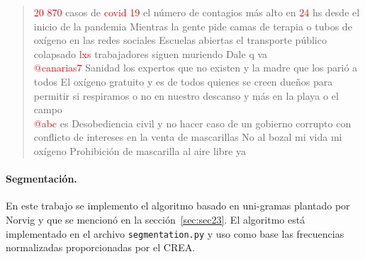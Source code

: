 \begin{quote}
	\textcolor{red}{}\textcolor{red}{20} \textcolor{red}{870} casos de \textcolor{red}{covid} \textcolor{red}{19} el número de contagios más alto en \textcolor{red}{24} hs desde el inicio de la pandemia Mientras la gente pide camas de terapia o tubos de oxígeno en las redes sociales Escuelas abiertas el transporte público colapsado \textcolor{red}{lxs} trabajadores siguen muriendo Dale q va \textcolor{red}{} 
	\vspace{12pt} \\
	\textcolor{red}{}\textcolor{red}{@canarias7} Sanidad los expertos que no existen y la madre que los parió a todos El oxígeno gratuito y es de todos quienes se creen dueños para permitir si respiramos o no en nuestro descanso y más en la playa o el campo \textcolor{red}{} 
	\vspace{12pt} \\
	\textcolor{red}{}\textcolor{red}{@abc} es Desobediencia civil y no hacer caso de un gobierno corrupto con conflicto de intereses en la venta de mascarillas No al bozal mi vida mi oxígeno Prohibición de mascarilla al aire libre ya \textcolor{red}{} 
	\vspace{12pt} \\
\end{quote}

\paragraph{Segmentación.} En este trabajo se implemento el algoritmo basado en uni-gramas plantado por Norvig y que se mencionó en la sección~\ref{sec:sec23}. El algoritmo está implementado en el archivo \texttt{segmentation.py} y uso como base las frecuencias normalizadas proporcionadas por el CREA.












